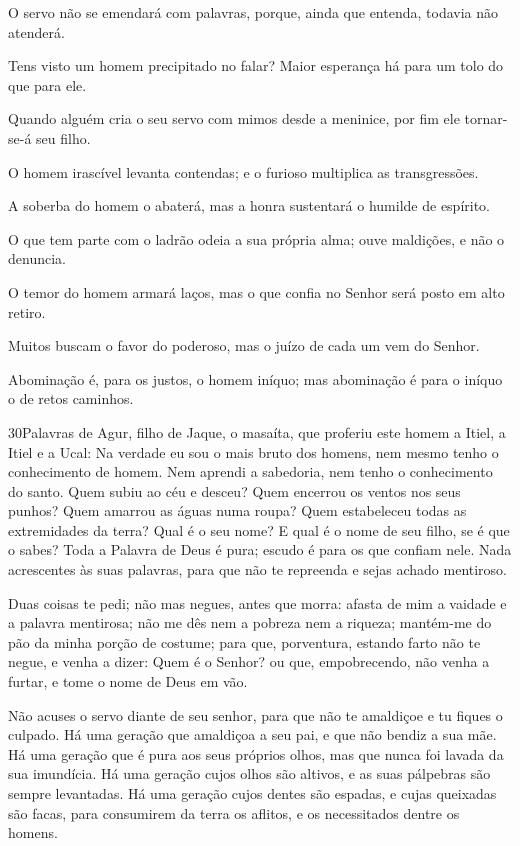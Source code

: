 O servo não se emendará com palavras, porque, ainda que entenda,
todavia não atenderá.

Tens visto um homem precipitado no falar? Maior esperança há para
um tolo do que para ele.

Quando alguém cria o seu servo com mimos desde a meninice, por
fim ele tornar-se-á seu filho.

O homem irascível levanta contendas; e o furioso multiplica as
transgressões.

A soberba do homem o abaterá, mas a honra sustentará o humilde de
espírito.

O que tem parte com o ladrão odeia a sua própria alma; ouve
maldições, e não o denuncia.

O temor do homem armará laços, mas o que confia no Senhor será
posto em alto retiro.

Muitos buscam o favor do poderoso, mas o juízo de cada um vem do
Senhor.

Abominação é, para os justos, o homem iníquo; mas abominação é
para o iníquo o de retos caminhos.

\medskip

\lettrine{30}{}Palavras de Agur, filho de Jaque, o masaíta, que
proferiu este homem a Itiel, a Itiel e a Ucal: Na verdade eu sou
o mais bruto dos homens, nem mesmo tenho o conhecimento de homem.
Nem aprendi a sabedoria, nem tenho o conhecimento do santo.
Quem subiu ao céu e desceu? Quem encerrou os ventos nos seus
punhos? Quem amarrou as águas numa roupa? Quem estabeleceu todas as
extremidades da terra? Qual é o seu nome? E qual é o nome de seu
filho, se é que o sabes? Toda a Palavra de Deus é pura; escudo é
para os que confiam nele. Nada acrescentes às suas palavras,
para que não te repreenda e sejas achado mentiroso.

Duas coisas te pedi; não mas negues, antes que morra: afasta
de mim a vaidade e a palavra mentirosa; não me dês nem a pobreza nem
a riqueza; mantém-me do pão da minha porção de costume; para
que, porventura, estando farto não te negue, e venha a dizer: Quem é
o Senhor? ou que, empobrecendo, não venha a furtar, e tome o nome de
Deus em vão.

Não acuses o servo diante de seu senhor, para que não te
amaldiçoe e tu fiques o culpado. Há uma geração que amaldiçoa
a seu pai, e que não bendiz a sua mãe. Há uma geração que é
pura aos seus próprios olhos, mas que nunca foi lavada da sua
imundícia. Há uma geração cujos olhos são altivos, e as suas
pálpebras são sempre levantadas. Há uma geração cujos dentes
são espadas, e cujas queixadas são facas, para consumirem da terra
os aflitos, e os necessitados dentre os homens.

